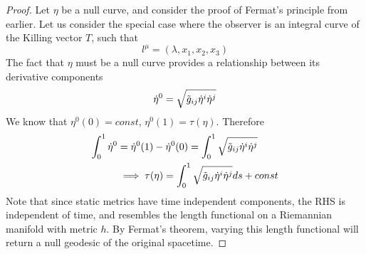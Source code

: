 \begin{proof}
Let $\eta$ be a null curve, and consider the proof of Fermat's principle from earlier. Let us consider the special case where the observer is an integral curve of the Killing vector $T$, such that
\begin{equation}\label{}
l^{\mu} = (\lambda, x_1, x_2, x_3)
\end{equation}
The fact that $\eta$ must be a null curve provides a relationship between its derivative components
\begin{equation}\label{}
\dot{\eta}^0 = \sqrt{\tilde{g}_{ij} \dot{\eta}^i \dot{\eta}^j}
\end{equation}
We know that $\eta^0(0) = const$, $\eta^0(1) = \tau(\eta)$. Therefore
\begin{align*}
\int_0^1 \dot{\eta}^0 &= \dot{\eta}^0(1) - \dot{\eta}^0(0) = \int_0^1 \sqrt{\tilde{g}_{ij} \dot{\eta}^i \dot{\eta}^j} \\
&\implies \tau(\eta) = \int_0^1 \sqrt{\tilde{g}_{ij} \dot{\eta}^i \dot{\eta}^j} ds + const
\end{align*}
Note that since static metrics have time independent components, the RHS is independent of time, and resembles the length functional on a Riemannian manifold with metric $h$. By Fermat's theorem, varying this length functional will return a null geodesic of the original spacetime.
\end{proof}

